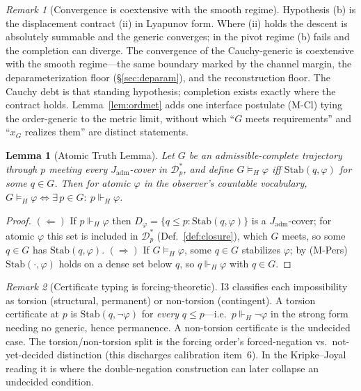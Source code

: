 \documentclass[11pt]{article}
\newtheorem{lemma}{Lemma}
\theoremstyle{definition}
\theoremstyle{remark}
\newtheorem*{remark}{Remark}
\newcommand{\forcesH}{\Vdash_{H}}
\newcommand{\refines}{\leq}
\newcommand{\Stab}{\mathrm{Stab}}
\newcommand{\Jadm}{J_{\mathrm{adm}}}
\begin{document}
\begin{remark}[Convergence is coextensive with the smooth regime]
Hypothesis (b) is the displacement contract (ii) in Lyapunov form. Where (ii) holds the descent is
absolutely summable and the generic converges; in the pivot regime (b) fails and the completion can
diverge. The convergence of the Cauchy-generic is coextensive with the smooth regime---the same
boundary marked by the channel margin, the deparameterization floor (\S\ref{sec:deparam}), and the
reconstruction floor. The Cauchy debt is that standing hypothesis; completion exists exactly where the
contract holds. Lemma~\ref{lem:ordmet} adds one interface postulate (M-Cl) tying the order-generic to
the metric limit, without which ``$G$ meets requirements'' and ``$x_G$ realizes them'' are distinct
statements.
\end{remark}

\begin{lemma}[Atomic Truth Lemma]\label{lem:atomic}
Let $G$ be an admissible-complete trajectory through $p$ meeting every $\Jadm$-cover in
$\mathcal{D}_p^\ast$, and define $G\models_H\varphi$ iff $\Stab(q,\varphi)$ for some $q\in G$. Then for
atomic $\varphi$ in the observer's countable vocabulary,
$G\models_H\varphi \iff \exists\,p\in G:\ p\forcesH\varphi$.
\end{lemma}

\begin{proof}
$(\Leftarrow)$ If $p\forcesH\varphi$ then $D_\varphi=\{q\refines p:\Stab(q,\varphi)\}$ is a
$\Jadm$-cover; for atomic $\varphi$ this set is included in $\mathcal{D}_p^\ast$
(Def.~\ref{def:closure}), which $G$ meets, so some $q\in G$ has $\Stab(q,\varphi)$. $(\Rightarrow)$ If
$G\models_H\varphi$, some $q\in G$ stabilizes $\varphi$; by (M-Pers) $\Stab(\cdot,\varphi)$ holds on a
dense set below $q$, so $q\forcesH\varphi$ with $q\in G$.
\end{proof}

\begin{remark}[Certificate typing is forcing-theoretic]\label{rem:torsion}
I3 classifies each impossibility as torsion (structural, permanent) or non-torsion (contingent). A
torsion certificate at $p$ is $\Stab(q,\neg\varphi)$ for \emph{every} $q\refines p$---i.e.\
$p\forcesH\neg\varphi$ in the strong form needing no generic, hence permanence. A non-torsion
certificate is the undecided case. The torsion/non-torsion split is the forcing order's forced-negation
vs.\ not-yet-decided distinction (this discharges calibration item~6). In the Kripke--Joyal reading it
is where the double-negation construction can later collapse an undecided condition.
\end{remark}
\end{document}
